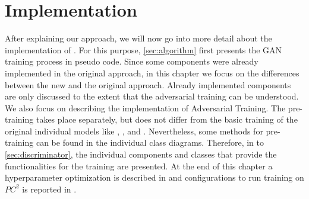 \chapter{Implementation}
\label{ch:implementation}


After explaining our approach, we will now go into more detail about the implementation of \ucgan.
For this purpose, \autoref{sec:algorithm} first presents the \ac{GAN} training process in pseudo code.
Since some components were already implemented in the original \kbgan approach, in this chapter we focus on the differences between the new \ucgan and the original approach.
Already implemented components are only discussed to the extent that the adversarial training can be understood.
We also focus on describing the implementation of Adversarial Training.
The pre-training takes place separately, but does not differ from the basic training of the original individual models like \distmult, \complex, \transe and \transd.
Nevertheless, some methods for pre-training can be found in the individual class diagrams.
Therefore, in  to \ref{sec:discriminator}, the individual components and classes that provide the functionalities for the training are presented.
At the end of this chapter a hyperparameter optimization is described in  and configurations to run training on $PC^2$ is reported in .
















